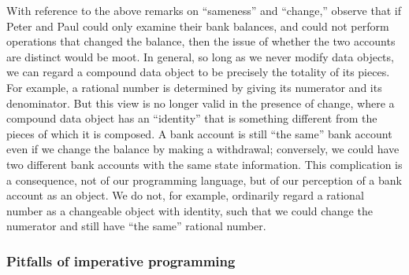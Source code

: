 With reference to the above remarks on “sameness” and “change,” observe that if Peter and Paul could only examine their bank balances, and could not perform operations that changed the balance, then the issue of whether the two accounts are distinct would be moot.
In general, so long as we never modify data objects, we can regard a compound data object to be precisely the totality of its pieces.
For example, a rational number is determined by giving its numerator and its denominator.
But this view is no longer valid in the presence of change, where a compound data object has an “identity” that is something different from the pieces of which it is composed.
A bank account is still “the same” bank account even if we change the balance by making a withdrawal;
conversely, we could have two different bank accounts with the same state information.
This complication is a consequence, not of our programming language, but of our perception of a bank account as an object.
We do not, for example, ordinarily regard a rational number as a changeable object with identity, such that we could change the numerator and still have “the same” rational number.



\subsubsection*{Pitfalls of imperative programming}

